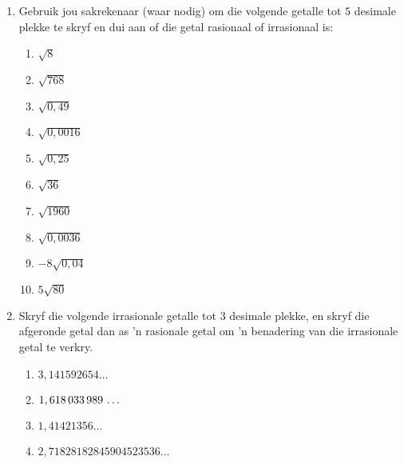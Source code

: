 \begin{eocexercises}{}
\begin{enumerate}[itemsep=5pt, label=\textbf{\arabic*}. ]
\item Gebruik jou sakrekenaar (waar nodig) om die volgende getalle tot  $5$ desimale plekke te skryf en dui aan of die getal rasionaal of irrasionaal is:
\begin{multicols}{2}
 \begin{enumerate}[itemsep=5pt, label=\textbf{(\alph*)} ] 
    \item $\sqrt{8}$
    \item $\sqrt{768}$
    \item $\sqrt{0,49}$
    \item $\sqrt{0,0016}$
    \item $\sqrt{0,25}$
    \item $\sqrt{36}$
    \item $\sqrt{1960}$
    \item $\sqrt{0,0036}$
    \item $-8\sqrt{0,04}$
    \item $5\sqrt{80}$
    \end{enumerate}
\end{multicols}

\item Skryf die volgende irrasionale getalle tot $3$ desimale plekke, en skryf die afgeronde getal dan as ’n rasionale getal om ’n benadering van die irrasionale getal te verkry.
\begin{multicols}{2}
\begin{enumerate}[itemsep=5pt, label=\textbf{(\alph*)} ] 
    \item $3,141592654\ldots$
    \item $1,618\phantom{\rule{0.166667em}{0ex}}033\phantom{\rule{0.166667em}{0ex}}989\phantom{\rule{0.166667em}{0ex}}\ldots$
    \item $1,41421356\ldots$
    \item $2,71828182845904523536\ldots$
    \end{enumerate}
\end{multicols}




\end{enumerate}
\end{eocexercises}
